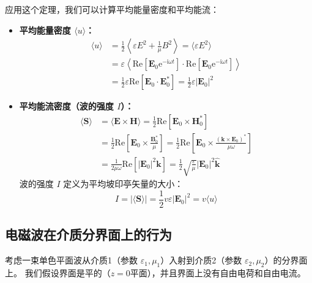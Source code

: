 \documentclass[fontset=none]{ctexart}
\begin{document}
应用这个定理，我们可以计算平均能量密度和平均能流：
\begin{itemize}
    \item \textbf{平均能量密度 $\langle u \rangle$：}
    \begin{equation}
    \begin{aligned}
        \langle u \rangle &= \frac{1}{2} \left\langle \varepsilon E^2 + \frac{1}{\mu} B^2 \right\rangle = \langle \varepsilon E^2 \rangle \\
        &= \varepsilon \left\langle \mathrm{Re}[\bm{E}_0 \mathrm{e}^{-\mathrm{i}\omega t}] \cdot \mathrm{Re}[\bm{E}_0 \mathrm{e}^{-\mathrm{i}\omega t}] \right\rangle \\
        &= \frac{1}{2} \varepsilon \mathrm{Re}[\bm{E}_0 \cdot \bm{E}_0^*] = \frac{1}{2} \varepsilon |\bm{E}_0|^2
    \end{aligned}
    \end{equation}

    \item \textbf{平均能流密度（波的强度 $I$）：}
    \begin{equation}
    \begin{aligned}
        \langle \bm{S} \rangle &= \langle \bm{E} \times \bm{H} \rangle = \frac{1}{2} \mathrm{Re}[\bm{E}_0 \times \bm{H}_0^*] \\
        &= \frac{1}{2} \mathrm{Re}\left[\bm{E}_0 \times \frac{\bm{B}_0^*}{\mu}\right] = \frac{1}{2} \mathrm{Re}\left[\bm{E}_0 \times \frac{(\bm{k} \times \bm{E}_0)^*}{\mu\omega}\right] \\
        &= \frac{1}{2\mu\omega} \mathrm{Re}[|\bm{E}_0|^2 \bm{k}] = \frac{1}{2} \sqrt{\frac{\varepsilon}{\mu}} |\bm{E}_0|^2 \hat{\bm{k}}
    \end{aligned}
    \end{equation}
    波的强度 $I$ 定义为平均坡印亭矢量的大小：
    \begin{equation}
        I = |\langle \bm{S} \rangle| = \frac{1}{2} v \varepsilon |\bm{E}_0|^2 = v \langle u \rangle
    \end{equation}
\end{itemize}

\subsection{电磁波在介质分界面上的行为}
考虑一束单色平面波从介质1（参数 $\varepsilon_1, \mu_1$）入射到介质2（参数 $\varepsilon_2, \mu_2$）的分界面上。
我们假设界面是平的（$z=0$平面），并且界面上没有自由电荷和自由电流。
\end{document}
